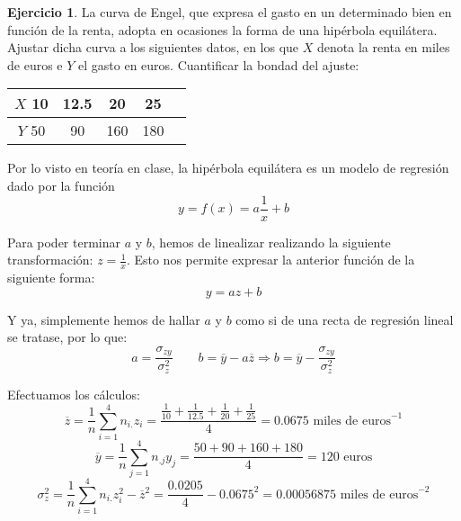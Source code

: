 \documentclass[a4paper, 12pt]{article}
\theoremstyle{definition}
\newtheorem{ej}{Ejercicio}
\begin{document}
\begin{ej}
La curva de Engel, que expresa el gasto en un determinado bien en función de la renta, adopta en ocasiones la forma de una hipérbola equilátera. Ajustar dicha curva a los siguientes datos, en los que \(X\) denota la renta en miles de euros e \(Y\) el gasto en euros. Cuantificar la bondad del ajuste:

\begin{center}
\end{center}
\begin{center}
\begin{tabular}{c|cccc}
	\(X\) 10 & 12.5 & 20 & 25 \\
	\hline
	\(Y\) 50 & 90 & 160 & 180 \\
\end{tabular}
\end{center}

Por lo visto en teoría en clase, la hipérbola equilátera es un modelo de regresión dado por la función
\[
	y = f(x) = a \frac{1}{x} + b
\]

Para poder terminar \(a\) y \(b\), hemos de linealizar realizando la siguiente transformación: \(z = \frac{1}{x}\). Esto nos permite expresar la anterior función de la siguiente forma:
\[
	y = az + b
\]

Y ya, simplemente hemos de hallar \(a\) y \(b\) como si de una recta de regresión lineal se tratase, por lo que:
\[
	a = \frac{\sigma_{zy}}{\sigma_z^2} \qquad b = \overline{y} - a \overline{z} \Rightarrow b = \overline{y} - \frac{\sigma_{zy}}{\sigma_z^2}
\]

Efectuamos los cálculos:
\[
	\overline{z} = \frac{1}{n} \sum_{i=1}^{4} n_{i.} z_i = \frac{\frac{1}{10}+\frac{1}{12.5}+\frac{1}{20}+\frac{1}{25}}{4} = 0.0675 \text{ miles de euros}^{-1}
\]
\[
	\overline{y} = \frac{1}{n} \sum_{j=1}^{4} n_{.j} y_j = \frac{50 + 90 + 160 + 180}{4} = 120 \text{ euros}
\]
\[
	\sigma_z^2 = \frac{1}{n} \sum_{i=1}^{4} n_{i.} z_i^2 - \overline{z}^2 = \frac{0.0205}{4} - 0.0675^2 = 0.00056875 \text{ miles de euros}^{-2}
\]


\end{ej}
\end{document}
